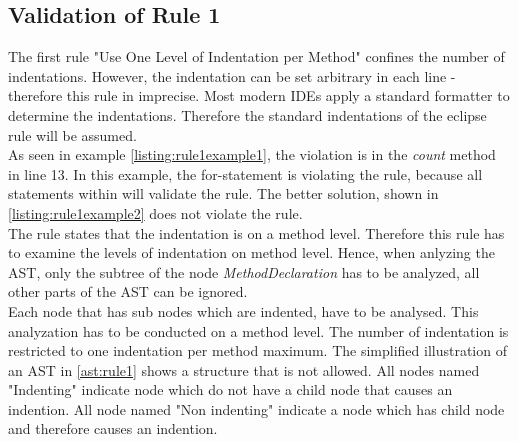  
 
 
 
  

\subsection*{Validation of Rule 1}

The first rule "Use One Level of Indentation per Method" confines the number of indentations. However, the indentation can be set arbitrary in each line - therefore this rule in imprecise. Most modern \acf{IDE}s apply a standard formatter to determine the indentations. Therefore the standard indentations of the eclipse rule will be assumed.
\\
As seen in example \ref{listing:rule1example1}, the violation is in the \textit{count} method in line 13. In this example, the for-statement is violating the rule, because all statements within will validate the rule. The better solution, shown in \ref{listing:rule1example2} does not violate the rule. 
\\
The rule states that the indentation is on a method level. Therefore this rule has to examine the levels of indentation on method level. Hence, when anlyzing the \acf{AST}, only the subtree of the node \textit{MethodDeclaration} has to be analyzed, all other parts of the \acf{AST} can be ignored. 
\\
Each node that has sub nodes which are indented, have to be analysed. This analyzation has to be conducted on a method level. The number of indentation is restricted to one indentation per method maximum. The simplified illustration of an \acf{AST} in \ref{ast:rule1} shows a structure that is not allowed. All nodes named "Indenting" indicate node which do not have a child node that causes an indention. All node named "Non indenting" indicate a node which has child node and therefore causes an indention.

